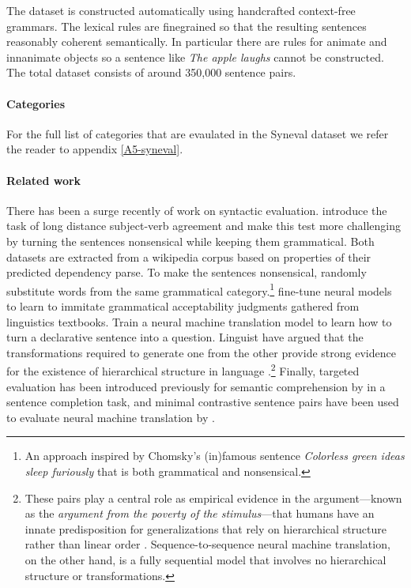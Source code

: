 The dataset is constructed automatically using handcrafted context-free grammars. The lexical rules are finegrained so that the resulting sentences reasonably coherent semantically. In particular there are rules for animate and innanimate objects so a sentence like \textit{The apple laughs} cannot be constructed. The total dataset consists of around 350,000 sentence pairs.

\paragraph{Categories} For the full list of categories that are evaulated in the Syneval dataset we refer the reader to appendix \ref{A5-syneval}.

\paragraph{Related work} There has been a surge recently of work on syntactic evaluation. \citet{linzen2016syntax} introduce the task of long distance subject-verb agreement and \citet{gulordava2018colorless} make this test more challenging by turning the sentences nonsensical while keeping them grammatical. Both datasets are extracted from a wikipedia corpus based on properties of their predicted dependency parse. To make the sentences nonsensical, \citet{gulordava2018colorless} randomly substitute words from the same grammatical category.\footnote{An approach inspired by Chomsky's (in)famous sentence \textit{Colorless green ideas sleep furiously} that is both grammatical and nonsensical.} \citet{warstadt2018acceptability} fine-tune neural models to learn to immitate grammatical acceptability judgments gathered from linguistics textbooks.
\citet{mccoy2018revisiting} Train a neural machine translation model to learn how to turn a declarative sentence into a question. Linguist have argued that the transformations required to generate one from the other provide strong evidence for the existence of hierarchical structure in language \cite{everaert2015structures}.\footnote{These pairs play a central role as empirical evidence in the argument---known as the \textit{argument from the poverty of the stimulus}---that humans have an innate predisposition for generalizations that rely on hierarchical structure rather than linear order \citep{chomsky1980rules}. Sequence-to-sequence neural machine translation, on the other hand, is a fully sequential model that involves no hierarchical structure or transformations.} Finally, targeted evaluation has been introduced previously for semantic comprehension by \citet{zweig2011microsoft} in a sentence completion task, and minimal contrastive sentence pairs have been used to evaluate neural machine translation by \citet{sennrich2017grammatical}.


